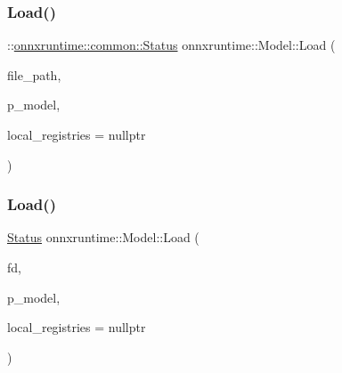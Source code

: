 \mbox{\label{classonnxruntime_1_1Model_a629f04ffae1930227a4dbe3591ff2f98}} 
\subsubsection{\texorpdfstring{Load()}{Load()}\hspace{0.1cm}{\footnotesize\ttfamily [2/5]}}
{\footnotesize\ttfamily \+::\mbox{\hyperlink{classonnxruntime_1_1common_1_1Status}{onnxruntime\+::common\+::\+Status}} onnxruntime\+::\+Model\+::\+Load (\begin{DoxyParamCaption}\item[{const std\+::string \&}]{file\+\_\+path,  }\item[{std\+::shared\+\_\+ptr$<$ \mbox{\hyperlink{classonnxruntime_1_1Model}{Model}} $>$ \&}]{p\+\_\+model,  }\item[{const \mbox{\hyperlink{namespaceonnxruntime_a37a91305e7190e83fa9c66117a6a4746}{I\+Onnx\+Runtime\+Op\+Schema\+Registry\+List}} $\ast$}]{local\+\_\+registries = {\ttfamily nullptr} }\end{DoxyParamCaption})\hspace{0.3cm}{\ttfamily [static]}}

\mbox{\label{classonnxruntime_1_1Model_ae2bc651564a923b007c572bee3f7e69d}} 
\subsubsection{\texorpdfstring{Load()}{Load()}\hspace{0.1cm}{\footnotesize\ttfamily [3/5]}}
{\footnotesize\ttfamily \mbox{\hyperlink{classonnxruntime_1_1common_1_1Status}{Status}} onnxruntime\+::\+Model\+::\+Load (\begin{DoxyParamCaption}\item[{int}]{fd,  }\item[{std\+::shared\+\_\+ptr$<$ \mbox{\hyperlink{classonnxruntime_1_1Model}{Model}} $>$ \&}]{p\+\_\+model,  }\item[{const \mbox{\hyperlink{namespaceonnxruntime_a37a91305e7190e83fa9c66117a6a4746}{I\+Onnx\+Runtime\+Op\+Schema\+Registry\+List}} $\ast$}]{local\+\_\+registries = {\ttfamily nullptr} }\end{DoxyParamCaption})\hspace{0.3cm}{\ttfamily [static]}}

